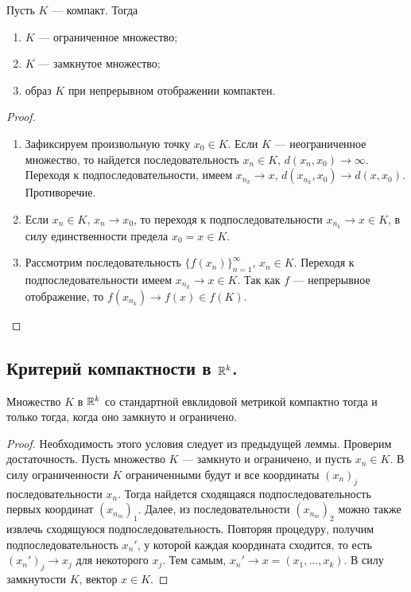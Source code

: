 \documentclass[a4paper]{article}
\theoremstyle{named}
\begin{document}
    \begin{lemma*}
        Пусть $K$ --- компакт. Тогда
        \begin{enumerate}
        \item
            $K$ --- ограниченное множество;

        \item
            $K$ --- замкнутое множество;

        \item
            образ $K$ при непрерывном отображении компактен.
        \end{enumerate}
    \end{lemma*}

    \begin{proof}
        ~

        \begin{enumerate}
        \item
            Зафиксируем произвольную точку $x_0 \in K$. Если $K$ --- неограниченное множество, то найдется последовательность $x_n \in K$, $d(x_n, x_0) \to \infty$. Переходя к подпоследовательности, имеем $x_{n_k} \to x$, $d(x_{n_k}, x_0) \to d(x, x_0)$. Противоречие.

        \item
            Если $x_n \in K$, $x_n \to x_0$, то переходя к подпоследовательности $x_{n_k} \to x \in K$, в силу единственности предела $x_0 = x \in K$.

        \item
            Рассмотрим последовательность $\{f(x_n)\}_{n = 1}^{\infty}$, $x_n \in K$. Переходя к подпоследовательности имеем $x_{n_k} \to x \in K$. Так как $f$ --- непрерывное отображение, то $f(x_{n_k}) \to f(x) \in f(K)$.
        \end{enumerate}
    \end{proof}

    \subsection{Критерий компактности в $\mathbb{R}^k$.}

    \begin{proposal*}
        Множество $K$ в $\mathbb{R}^k$ со стандартной евклидовой метрикой компактно тогда и только тогда, когда оно замкнуто и ограничено.
    \end{proposal*}

    \begin{proof}
        Необходимость этого условия следует из предыдущей леммы. Проверим достаточность. Пусть множество $K$ --- замкнуто и ограничено, и пусть $x_n \in K$. В силу ограниченности $K$ ограниченными будут и все координаты $(x_n)_j$ последовательности $x_n$. Тогда найдется сходящаяся подпоследовательность первых координат $(x_{n_m})_1$. Далее, из последовательности $(x_{n_m})_2$ можно также извлечь сходящуюся подпоследовательность. Повторяя процедуру, получим подпоследовательность $x_n'$, у которой каждая координата сходится, то есть $(x_n')_j \to x_j$ для некоторого $x_j$. Тем самым, $x_n' \to x = (x_1, \dots, x_k)$. В силу замкнутости $K$, вектор $x \in K$.
    \end{proof}
\end{document}
